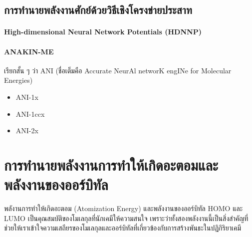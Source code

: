 \subsection{การทำนายพลังงานศักย์ด้วยวิธีเชิงโครงข่ายประสาท}
\label{ssec:pred_pot_ener_nn}

\paragraph{High-dimensional Neural Network Potentials (HDNNP)}
\autocite{behler2007}

\paragraph{ANAKIN-ME} เรียกสั้น ๆ ว่า ANI (ชื่อเต็มคือ Accurate NeurAl networK engINe for Molecular Energies)

\begin{itemize}
    \item ANI-1x\autocite{smith2017}
    \item ANI-1ccx\autocite{smith2018}
    \item ANI-2x\autocite{smith2019,devereux2020}
\end{itemize}

\section{การทำนายพลังงานการทำให้เกิดอะตอมและพลังงานของออร์บิทัล}
\label{sec:pred_ener_atom_orb}

พลังานการทำให้เกิดอะตอม (Atomization Energy) และพลังงานของออร์บิทัล HOMO และ LUMO เป็นคุณสมบัติของโมเลกุลที่นักเคมีให้ความสนใจ%
เพราะว่าทั้งสองพลังงานนี้เป็นสิ่งสำคัญที่ช่วยให้เราเข้าใจความเสถียรของโมเลกุลและออร์บิทัลที่เกี่ยวข้องกับการสร้างพันธะในปฏิกิริยาเคมี

